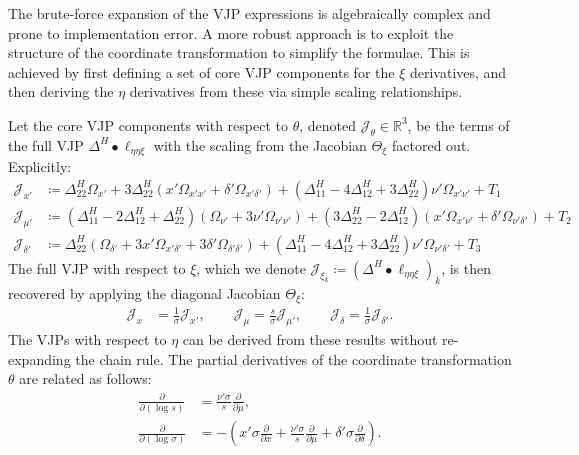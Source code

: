 \documentclass{article}
\begin{document}
The brute-force expansion of the VJP expressions is algebraically complex and prone to implementation error.
A more robust approach is to exploit the structure of the coordinate transformation to simplify the formulae.
This is achieved by first defining a set of core VJP components for the $\xi$ derivatives, and then deriving the $\eta$ derivatives from these via simple scaling relationships.

Let the core VJP components with respect to $\theta$, denoted $\mathcal{J}_{\theta} \in \mathbb{R}^3$, be the terms of the full VJP $\Delta^H \bullet \ell_{\eta\eta\xi}$ with the scaling from the Jacobian $\Theta_\xi$ factored out.
Explicitly:
%
\begin{align}
  \mathcal{J}_{x'}      & \coloneqq \Delta^H_{22} \Omega_{x'} + 3 \Delta^H_{22} (x' \Omega_{x'x'} + \delta' \Omega_{x'\delta'}) + (\Delta^H_{11} - 4\Delta^H_{12} + 3\Delta^H_{22}) \nu' \Omega_{x'\nu'} + T_1            \\
  \mathcal{J}_{\mu'}    & \coloneqq (\Delta^H_{11} - 2\Delta^H_{12} + \Delta^H_{22}) (\Omega_{\nu'} + 3\nu'\Omega_{\nu'\nu'}) + (3\Delta^H_{22} - 2\Delta^H_{12}) (x'\Omega_{x'\nu'} + \delta'\Omega_{\nu'\delta'}) + T_2 \\
  \mathcal{J}_{\delta'} & \coloneqq \Delta^H_{22} (\Omega_{\delta'} + 3 x' \Omega_{x'\delta'} + 3 \delta' \Omega_{\delta'\delta'}) + (\Delta^H_{11} - 4\Delta^H_{12} + 3\Delta^H_{22}) \nu' \Omega_{\nu'\delta'} + T_3
\end{align}
%
The full VJP with respect to $\xi$, which we denote $\mathcal{J}_{\xi_k} \coloneqq (\Delta^H \bullet \ell_{\eta\eta\xi})_k$, is then recovered by applying the diagonal Jacobian $\Theta_\xi$:
%
\begin{align}
  \mathcal{J}_x & = \frac{1}{\sigma} \mathcal{J}_{x'}, \qquad \mathcal{J}_\mu = \frac{s}{\sigma} \mathcal{J}_{\mu'}, \qquad \mathcal{J}_\delta = \frac{1}{\sigma} \mathcal{J}_{\delta'}.
\end{align}
%
The VJPs with respect to $\eta$ can be derived from these results without re-expanding the chain rule.
The partial derivatives of the coordinate transformation $\theta$ are related as follows:
%
\begin{align}
  \frac{\partial}{\partial (\log s)}      & = \frac{\nu' \sigma}{s} \frac{\partial}{\partial \mu},                                                                                                            \\
  \frac{\partial}{\partial (\log \sigma)} & = - \left( x' \sigma \frac{\partial}{\partial x} + \frac{\nu' \sigma}{s} \frac{\partial}{\partial \mu} + \delta' \sigma \frac{\partial}{\partial \delta} \right).
\end{align}
\end{document}
